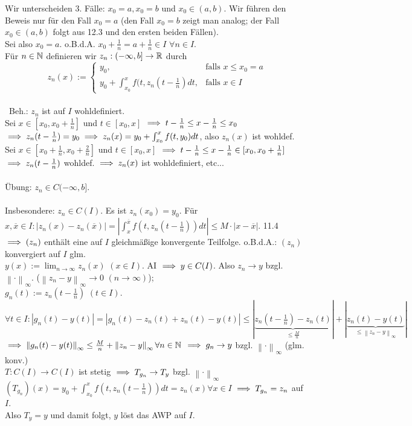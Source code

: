 \documentclass{article}
\begin{document}
\begin{beweis}[Nr.2]
Wir unterscheiden 3. Fälle: $x_0 = a, x_0 = b$ und $x_0 \in (a,b)$. Wir führen den Beweis nur für den Fall $x_0 = a$ (den Fall $x_0 = b$ zeigt man analog; 
der Fall $x_0 \in (a,b) $ folgt aus 12.3 und den ersten beiden Fällen). \\ Sei also $x_0 = a$. o.B.d.A. $x_0+\frac{1}{n}=a+\frac{1}{n} \in I$ $\forall n \in I$. \\
Für $n \in \mathbb{N}$ definieren wir $z_n : (-\infty,b] \to \mathbb{R}$ durch 
$$z_n(x):=
\begin{cases}
y_0, & \text{falls } x \leq x_0 = a  \\
y_0 +\int_{x_0}^{x}f(t,z_n(t-\frac{1}{n}) dt, & \text{falls } x \in I
\end{cases}$$\\\
Beh.: $z_n$ ist auf $I$ wohldefiniert.\\
Sei $x \in [x_0, x_0+\frac{1}{n}]$ und $ t \in [x_0, x]$ $\implies t-\frac{1}{n} \leq x-\frac{1}{n} \leq x_0$
$\implies z_n(t-\frac{1}{n}) = y_0 \implies z_n(x) = y_0 + \int_{x_0}^{x}f(t,y_0) dt$, also $z_n(x)$ ist wohldef.\\
Sei $x \in [x_0+\frac{1}{n},x_0+\frac{2}{n}]$ und $t \in [x_0,x]$ $\implies t-\frac{1}{n} \leq x-\frac{1}{n} \in [x_0, x_0+\frac{1}{n}]$
$\implies z_n(t-\frac{1}{n})$ wohldef. $\implies z_n(x)$ ist wohldefiniert, etc... \\\\
Übung: $z_n \in C(-\infty, b]$. \\\\
Insbesondere: $z_n \in C(I)$. Es ist $z_n(x_0) = y_0$. Für $x,\overline{x} \in I: 
|z_n(x)-z_n(\overline{x})| = | \int_{x}^{\overline{x}}f(t,z_n(t-\frac{1}{n})) dt | \leq M \cdot |x-\overline{x}|.$ 
11.4 $\implies (z_n)$ enthält eine auf $I$ gleichmäßige konvergente Teilfolge. o.B.d.A.: $(z_n)$ konvergiert auf $I$ glm. \\
$y(x):= \lim_{n \to \infty} z_n(x)$ $(x \in I)$. AI $\implies y \in C(I)$. Also $z_n \to y$ bzgl. $\left\|\cdot\right\|_{\infty}$. 
($\left\|z_n-y\right\|_{\infty} \to 0$ $( n \to \infty ) $); \\ $g_n(t) := z_n(t-\frac{1}{n})$ $(t \in I)$. 
$\forall t \in I : |g_n(t)-y(t)| = | g_n(t)-z_n(t)+z_n(t)-y(t) | \leq |\underbrace{z_n(t-\frac{1}{n})-z_n(t)}_{\leq \frac{M}{n}}|+|\underbrace{z_n(t)-y(t)}_{\leq \left\|z_n-y \right\|_{\infty}} |$\\
$\implies \left\| g_n(t) - y(t) \right\|_{\infty} \leq \frac{M}{n} +\left\|z_n-y \right\|_{\infty} \forall n \in \mathbb{N}$
$\implies g_n \to y $ bzgl. $\left\|\cdot\right\|_{\infty}$ (glm. konv.) \\
$T: C(I) \to C(I)$ ist stetig $\implies T_{g_n} \to T_y $ bzgl. $\left\|\cdot\right\|_{\infty}$ \\
$(T_{g_n})(x) = y_0 + \int_{x_0}^{x}f(t,z_n(t-\frac{1}{n})) dt = z_n(x) \forall x \in I$ 
$\implies T_{g_n}=z_n$ auf $I$. \\ Also $T_y = y$ und damit folgt, $y$ löst das AWP auf $I$.
\end{beweis}
\end{document}
